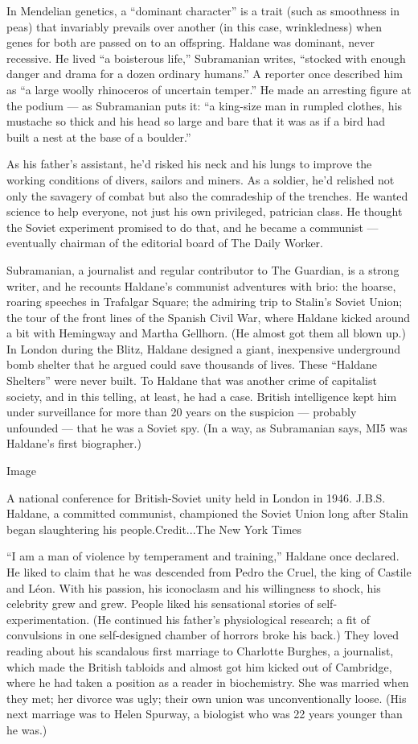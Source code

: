 In Mendelian genetics, a ``dominant character'' is a trait (such as
smoothness in peas) that invariably prevails over another (in this case,
wrinkledness) when genes for both are passed on to an offspring. Haldane
was dominant, never recessive. He lived ``a boisterous life,''
Subramanian writes, ``stocked with enough danger and drama for a dozen
ordinary humans.'' A reporter once described him as ``a large woolly
rhinoceros of uncertain temper.'' He made an arresting figure at the
podium --- as Subramanian puts it: ``a king-size man in rumpled clothes,
his mustache so thick and his head so large and bare that it was as if a
bird had built a nest at the base of a boulder.''

As his father's assistant, he'd risked his neck and his lungs to improve
the working conditions of divers, sailors and miners. As a soldier, he'd
relished not only the savagery of combat but also the comradeship of the
trenches. He wanted science to help everyone, not just his own
privileged, patrician class. He thought the Soviet experiment promised
to do that, and he became a communist --- eventually chairman of the
editorial board of The Daily Worker.

Subramanian, a journalist and regular contributor to The Guardian, is a
strong writer, and he recounts Haldane's communist adventures with brio:
the hoarse, roaring speeches in Trafalgar Square; the admiring trip to
Stalin's Soviet Union; the tour of the front lines of the Spanish Civil
War, where Haldane kicked around a bit with Hemingway and Martha
Gellhorn. (He almost got them all blown up.) In London during the Blitz,
Haldane designed a giant, inexpensive underground bomb shelter that he
argued could save thousands of lives. These ``Haldane Shelters'' were
never built. To Haldane that was another crime of capitalist society,
and in this telling, at least, he had a case. British intelligence kept
him under surveillance for more than 20 years on the suspicion ---
probably unfounded --- that he was a Soviet spy. (In a way, as
Subramanian says, MI5 was Haldane's first biographer.)

Image

A national conference for British-Soviet unity held in London in 1946.
J.B.S. Haldane, a committed communist, championed the Soviet Union long
after Stalin began slaughtering his people.Credit...The New York Times

``I am a man of violence by temperament and training,'' Haldane once
declared. He liked to claim that he was descended from Pedro the Cruel,
the king of Castile and Léon. With his passion, his iconoclasm and his
willingness to shock, his celebrity grew and grew. People liked his
sensational stories of self-experimentation. (He continued his father's
physiological research; a fit of convulsions in one self-designed
chamber of horrors broke his back.) They loved reading about his
scandalous first marriage to Charlotte Burghes, a journalist, which made
the British tabloids and almost got him kicked out of Cambridge, where
he had taken a position as a reader in biochemistry. She was married
when they met; her divorce was ugly; their own union was
unconventionally loose. (His next marriage was to Helen Spurway, a
biologist who was 22 years younger than he was.)

